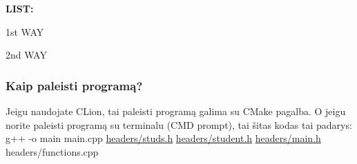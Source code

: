 {\bfseries{L\+I\+ST\+:}}
\begin{DoxyItemize}
\item 1st W\+AY 
\begin{DoxyCode}{0}
\end{DoxyCode}

\item 2nd W\+AY 
\begin{DoxyCode}{0}
\end{DoxyCode}

\end{DoxyItemize}

\subsubsection*{Kaip paleisti programą?}

Jeigu naudojate C\+Lion, tai paleisti programą galima su C\+Make pagalba. O jeigu norite paleisti programą su terminalu (C\+MD prompt), tai šitas kodas tai padarys\+: {\ttfamily g++ -\/o main main.\+cpp \mbox{\hyperlink{studs_8h_source}{headers/studs.\+h}} \mbox{\hyperlink{student_8h_source}{headers/student.\+h}} \mbox{\hyperlink{main_8h_source}{headers/main.\+h}} headers/functions.\+cpp} 